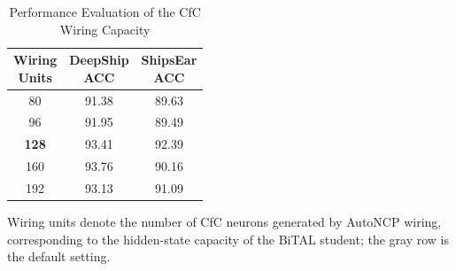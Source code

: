 ﻿\documentclass[lettersize,journal]{IEEEtran}
\begin{document}
\begin{table}[htbp]
\centering
\caption{Performance Evaluation of the CfC Wiring Capacity}
\label{tab:cfc_capacity_analysis}
\small
\setlength{\tabcolsep}{10pt}
\begin{tabular}{c|c|c}
\toprule
\makecell{Wiring\\Units} &
\makecell{DeepShip\\ACC} &
\makecell{ShipsEar\\ACC} \\
\midrule
80  & 91.38 & 89.63 \\
96  & 91.95 & 89.49 \\
\rowcolor{gray!15}
\textbf{128} & 93.41 & 92.39 \\
160 & 93.76 & 90.16 \\
192 & 93.13 & 91.09 \\
\bottomrule
\end{tabular}
\vspace{0.5ex}
\par\footnotesize Wiring units denote the number of CfC neurons generated by AutoNCP wiring, corresponding to the hidden-state capacity of the BiTAL student; the gray row is the default setting.
\end{table}
\end{document}
